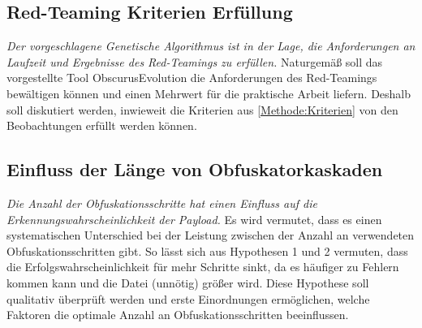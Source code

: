 \subsection{Red-Teaming Kriterien Erfüllung}
\textit{Der vorgeschlagene Genetische Algorithmus ist in der Lage, die Anforderungen an Laufzeit und Ergebnisse des Red-Teamings zu erfüllen.}
Naturgemäß soll das vorgestellte Tool ObscurusEvolution die Anforderungen des Red-Teamings bewältigen können und einen Mehrwert für die praktische Arbeit liefern. Deshalb soll diskutiert werden, inwieweit die Kriterien aus \ref{Methode:Kriterien} von den Beobachtungen erfüllt werden können.
\subsection{Einfluss der Länge von Obfuskatorkaskaden}
\textit{Die Anzahl der Obfuskationsschritte hat einen Einfluss auf die Erkennungswahrscheinlichkeit der Payload.} Es wird vermutet, dass es einen systematischen Unterschied bei der Leistung zwischen der Anzahl an verwendeten Obfuskationsschritten gibt. So lässt sich aus Hypothesen 1 und 2 vermuten, dass die Erfolgswahrscheinlichkeit für mehr Schritte sinkt, da es häufiger zu Fehlern kommen kann und die Datei (unnötig) größer wird. Diese Hypothese soll qualitativ überprüft werden und erste Einordnungen ermöglichen, welche Faktoren die optimale Anzahl an Obfuskationsschritten beeinflussen.
